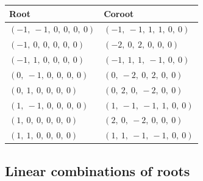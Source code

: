 \documentclass[11pt]{article}
\theoremstyle{definition}
\newif\ifsummablepairs
\begin{document}
\bigskip

\noindent \begin{tabular}{|l|l|}
    \hline
    \textbf{Root} & \textbf{Coroot} \\
    \hline
    $\left( -1, \  -1, \  0, \  0, \  0, \  0\right)$ & $\left( -1, \  -1, \  1, \  1, \  0, \  0\right)$ \\
    \hline
    $\left( -1, \  0, \  0, \  0, \  0, \  0\right)$ & $\left( -2, \  0, \  2, \  0, \  0, \  0\right)$ \\
    \hline
    $\left( -1, \  1, \  0, \  0, \  0, \  0\right)$ & $\left( -1, \  1, \  1, \  -1, \  0, \  0\right)$ \\
    \hline
    $\left( 0, \  -1, \  0, \  0, \  0, \  0\right)$ & $\left( 0, \  -2, \  0, \  2, \  0, \  0\right)$ \\
    \hline
    $\left( 0, \  1, \  0, \  0, \  0, \  0\right)$ & $\left( 0, \  2, \  0, \  -2, \  0, \  0\right)$ \\
    \hline
    $\left( 1, \  -1, \  0, \  0, \  0, \  0\right)$ & $\left( 1, \  -1, \  -1, \  1, \  0, \  0\right)$ \\
    \hline
    $\left( 1, \  0, \  0, \  0, \  0, \  0\right)$ & $\left( 2, \  0, \  -2, \  0, \  0, \  0\right)$ \\
    \hline
    $\left( 1, \  1, \  0, \  0, \  0, \  0\right)$ & $\left( 1, \  1, \  -1, \  -1, \  0, \  0\right)$ \\
    \hline
\end{tabular}


\ifsummablepairs
\subsection{Linear combinations of roots}
\end{document}
